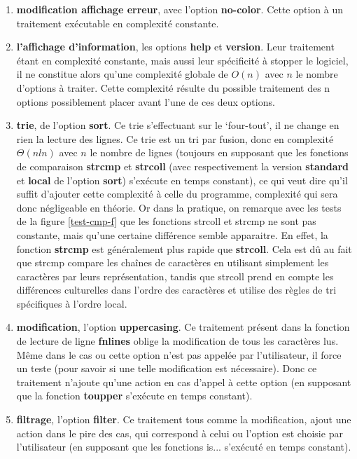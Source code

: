 \documentclass[12pt]{article}
\begin{document}
    \begin{enumerate}
        \item[] \textbf{modification affichage erreur},  avec l'option 
        \textbf{no-color}. Cette option à un traitement exécutable en 
        complexité constante.
        \item[] \textbf{l'affichage d'information}, les options \textbf{help} et 
        \textbf{version}. Leur traitement étant en complexité constante, mais 
        aussi leur spécificité à stopper le logiciel, il ne constitue alors 
        qu'une complexité globale de $O(n)$ avec $n$ le nombre d'options à 
        traiter. Cette complexité résulte du possible traitement des n options 
        possiblement placer avant l'une de ces deux options.
        \item[] \textbf{trie}, de l'option \textbf{sort}. Ce trie s'effectuant 
        sur le `four-tout', il ne change en rien la lecture des lignes. Ce trie 
        est un tri par fusion, donc en complexité $\Theta(nln)$ avec $n$ le 
        nombre de lignes (toujours en supposant que les fonctions de comparaison 
        \textbf{strcmp} et \textbf{strcoll} (avec respectivement la version 
        \textbf{standard} et \textbf{local} de l'option \textbf{sort}) 
        s'exécute en temps constant), ce qui veut dire qu'il suffit d'ajouter 
        cette complexité à celle du programme, complexité qui sera donc 
        négligeable en théorie. Or dans la pratique, on remarque avec les tests de
         la figure \ref{test-cmp-f} que les fonctions strcoll et strcmp ne sont 
        pas constante, mais qu'une certaine différence semble apparaitre. En
        effet, la fonction \textbf{strcmp} est généralement plus rapide que 
        \textbf{strcoll}. Cela est dû au fait que strcmp compare les chaînes de 
        caractères en utilisant simplement les caractères par leurs 
        représentation, tandis que strcoll prend en compte les différences 
        culturelles dans l'ordre des caractères et utilise des règles de tri 
        spécifiques à l'ordre local.        
        \item[] \textbf{modification}, l'option \textbf{uppercasing}. Ce 
        traitement présent dans la fonction de lecture de ligne \textbf{fnlines} 
        oblige la modification de tous les caractères lus. Même dans le cas ou 
        cette option n'est pas appelée par l'utilisateur, il force un teste 
        (pour savoir si une telle modification est nécessaire). Donc ce 
        traitement n'ajoute qu'une action en cas d'appel à cette option (en 
        supposant que la fonction \textbf{toupper} s'exécute en temps constant).
        \item[] \textbf{filtrage}, l'option \textbf{filter}. Ce traitement tous 
        comme la modification, ajout une action dans le pire des cas, qui 
        correspond à celui ou l'option est choisie par l'utilisateur (en 
        supposant que les fonctions is... s'exécuté en temps constant). 
    \end{enumerate}
\end{document}
